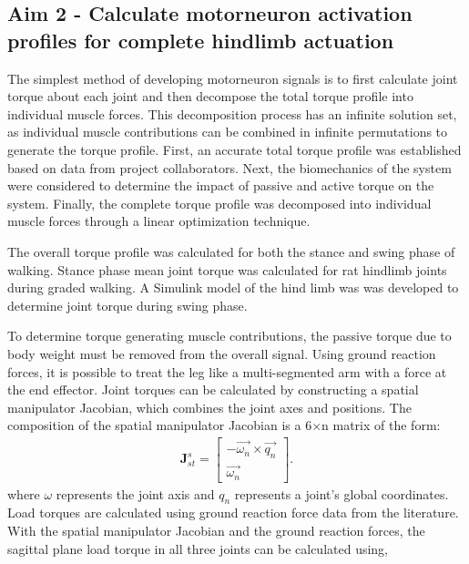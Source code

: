 \documentclass[runningheads,a4paper]{llncs}
\begin{document}
\subsection{Aim 2 - Calculate motorneuron activation profiles for complete hindlimb actuation}
		The simplest method of developing motorneuron signals is to first calculate joint torque about each joint and then decompose the total torque profile into individual muscle forces. This decomposition process has an infinite solution set, as individual muscle contributions can be combined in infinite permutations to generate the torque profile. First, an accurate total torque profile was established based on data from project collaborators. Next, the biomechanics of the system were considered to determine the impact of passive and active torque on the system. Finally, the complete torque profile was decomposed into individual muscle forces through a linear optimization technique. \par 
		The overall torque profile was calculated for both the stance and swing phase of walking. Stance phase mean joint torque was calculated for rat hindlimb joints during graded walking\cite{andrada_biomechanics_2013}. A Simulink model of the hind limb was was developed to determine joint torque during swing phase. \par
		To determine torque generating muscle contributions, the passive torque due to body weight must be removed from the overall signal. Using ground reaction forces, it is possible to treat the leg like a multi-segmented arm with a force at the end effector.  Joint torques can be calculated by constructing a spatial manipulator Jacobian\cite{murray_mathematical_1994}, which combines the joint axes and positions. The composition of the spatial manipulator Jacobian is a 6$\times$n matrix of the form:
			\begin{align*}
				\textbf{J}^{s}_{st} =
				\begin{bmatrix}
					-\overrightarrow{\omega_{n}} \times \overrightarrow{q_n} \\
					\overrightarrow{\omega_{n}}
				\end{bmatrix}.
			\end{align*}
			where $\omega$ represents the joint axis and $q_{n}$ represents a joint's global coordinates.
		Load torques are calculated using ground reaction force data\cite{muir_ground_1999} from the literature. With the spatial manipulator Jacobian and the ground reaction forces, the sagittal plane load torque in all three joints can be calculated using,
\end{document}
